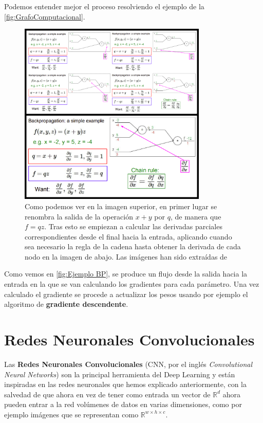            
            \noindent Podemos entender mejor el proceso resolviendo el ejemplo de la \autoref{fig:GrafoComputacional}.

            \begin{figure}[!h]
                \centering
                \includegraphics[width=0.8\textwidth]{img/BP_ejemplo.png}
                \caption{Como podemos ver en la imagen superior, en primer lugar se renombra la salida de la operación $x+y$ por $q$, de manera que $f=qz$. Tras esto se empiezan a calcular las derivadas parciales correspondientes desde el final hacia la entrada, aplicando cuando sea necesario la regla de la cadena hasta obtener la derivada de cada nodo en la imagen de abajo. Las imágenes han sido extraídas de \cite{StanfordCourse}}
                \label{fig:Ejemplo BP}
            \end{figure}

            \noindent Como vemos en \autoref{fig:Ejemplo BP}, se produce un flujo desde la salida hacia la entrada en la que se van calculando los gradientes para cada parámetro. Una vez calculado el gradiente se procede a actualizar los pesos usando por ejemplo el algoritmo de \textbf{gradiente descendente}.
        
    \section{Redes Neuronales Convolucionales}
        \noindent Las \textbf{Redes Neuronales Convolucionales} (CNN, por el inglés \textit{Convolutional Neural Networks}) son la principal herramienta del Deep Learning y están inspiradas en las redes neuronales que hemos explicado anteriormente, con la salvedad de que ahora en vez de tener como entrada un vector de $\mathbb{R}^d$ ahora pueden entrar a la red volúmenes de datos en varias dimensiones, como por ejemplo imágenes que se representan como $\mathbb{R}^{w\times h\times c}$.
        
